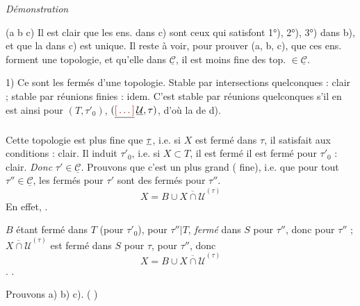 \documentclass[11pt,a4paper]{article}
\begin{document}
\emph{Démonstration}

 (a b c) Il est clair que les ens. \ill{} dans c) sont ceux qui satisfont 1°), 2°), 3°) dans b), et que la  dans c) est unique. Il reste à voir, pour prouver (a, b, c), que ces ens. forment une topologie, et qu'elle \add{\ill{}}  dans $\underline{\mathcal{C}}$, il est  moins fine des top. $\in \underline{\mathcal{C}}$.

1) Ce sont les fermés d'une topologie. Stable par intersections quelconques : clair ; stable par réunions finies : idem. C'est \uncertain{=} stable par réunions quelconques s'il en est ainsi pour $(T, \tau'_0)$, $(\struck{\ill{}}\,\uncertain{\mathcal{U}}, \tau)$, d'où la  de d).

Cette topologie est plus fine que $\uncertain{\tau}$, i.e. si $X$ est fermé dans $\tau$, il satisfait aux conditions : clair. Il induit $\tau'_0$, i.e. si $X \subset T$, il est fermé  il est fermé pour $\tau'_0$ : clair. \emph{Donc} $\tau' \in \underline{\mathcal{C}}$. Prouvons que c'est un plus grand  ( fine), i.e. que pour tout $\tau'' \in \underline{\mathcal{C}}$, les fermés pour $\tau'$ sont des fermés pour $\tau''$.
\[
  X = B \cup \overline{X \cap \mathcal{U}}^{(\tau)}
\]
En effet, \ill{} \ill{}.

$B$ étant fermé dans $T$ (pour $\tau'_0$), \struck{\ill{}}  pour $\tau''|T$, \emph{fermé} dans $S$ pour $\tau''$, donc pour $\tau''$ ;
$\overline{X \cap \mathcal{U}}^{(\tau)}$ est fermé dans $S$ pour $\tau$,  pour $\tau''$, donc
\[
  X = B \cup \overline{X \cap \mathcal{U}}^{(\tau)}
\]
. .

Prouvons a) b) c). (  \ill{})
\end{document}
